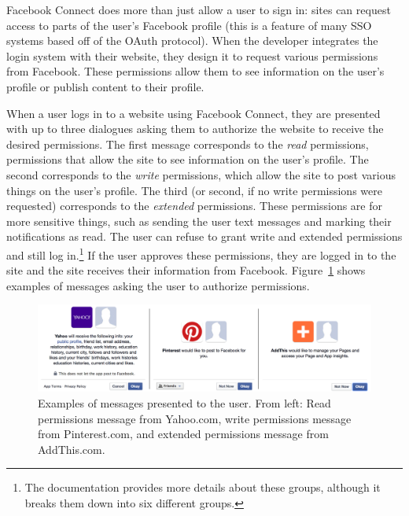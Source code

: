 \documentclass[10pt]{sig-alternate-10pt}
\begin{document}
Facebook Connect does more than just allow a user to sign in: sites can request access to parts of the user's Facebook profile (this is a feature of many SSO systems based off of the OAuth protocol). When the developer integrates the login system with their website, they design it to request various permissions from Facebook. These permissions allow them to see information on the user's profile or publish content to their profile. %

When a user logs in to a website using Facebook Connect, they are presented with up to three dialogues asking them to authorize the website to receive the desired permissions. The first message corresponds to the \emph{read} permissions, permissions that allow the site to see information on the user's profile. The second corresponds to the \emph{write} permissions, which allow the site to post various things on the user's profile. The third (or second, if no write permissions were requested) corresponds to the \emph{extended} permissions. These permissions are for more sensitive things, such as sending the user text messages and marking their notifications as read. The user can refuse to grant write and extended permissions and still log in.\footnote{The documentation \cite{fbpermsinstructions} provides more details about these groups, although it breaks them down into six different groups.} If the user approves these permissions, they are logged in to the site and the site receives their information from Facebook. Figure~\ref{figure:messageexample} shows examples of messages asking the user to authorize permissions.

\begin{figure}[htbp]
  \centering
  \includegraphics[width=16.5cm]{message_example}
  \caption{Examples of messages presented to the user. From left: Read permissions message from Yahoo.com, write permissions message from Pinterest.com, and extended permissions message from AddThis.com.}
  \label{figure:messageexample}
\end{figure}
\end{document}
